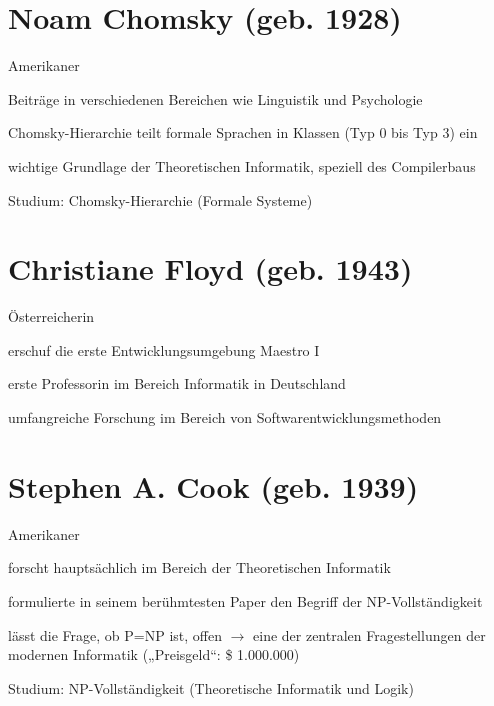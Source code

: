 \documentclass[a4paper,12pt]{scrreprt}
\begin{document}
\section*{Noam Chomsky (geb. 1928)}
\begin{itemize*}
    \item Amerikaner
    \item Beiträge in verschiedenen Bereichen wie Linguistik und Psychologie
    \item Chomsky-Hierarchie teilt formale Sprachen in Klassen (Typ 0 bis Typ 3) ein
    \item wichtige Grundlage der Theoretischen Informatik, speziell des Compilerbaus
    \item Studium: Chomsky-Hierarchie (Formale Systeme)
\end{itemize*}

\newpage

\section*{Christiane Floyd (geb. 1943)}
\begin{itemize*}
    \item Österreicherin
    \item erschuf die erste Entwicklungsumgebung Maestro I
    \item erste Professorin im Bereich Informatik in Deutschland
    \item umfangreiche Forschung im Bereich von Softwarentwicklungsmethoden
\end{itemize*}

\section*{Stephen A. Cook (geb. 1939)}
\begin{itemize*}
    \item Amerikaner
    \item forscht hauptsächlich im Bereich der Theoretischen Informatik
    \item formulierte in seinem berühmtesten Paper den Begriff der NP-Vollständigkeit
    \item lässt die Frage, ob P=NP ist, offen $\rightarrow$ eine der zentralen Fragestellungen
          der modernen Informatik („Preisgeld“: \$ 1.000.000)
    \item Studium: NP-Vollständigkeit (Theoretische Informatik und Logik)
\end{itemize*}
\end{document}
